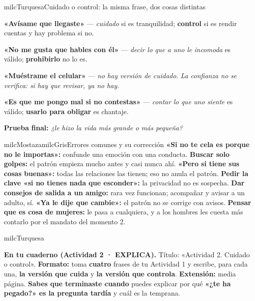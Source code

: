 \documentclass[11pt,letterpaper]{article}
\begin{document}
\begin{drawbox}{milcTurquesa}{Cuidado o control: la misma frase, dos cosas distintas}
\begin{pasoslista}
\item \textbf{«Avísame que llegaste»} — \emph{cuidado} si es tranquilidad; \textbf{control} si es rendir cuentas y hay problema si no.
\item \textbf{«No me gusta que hables con él»} — \emph{decir lo que a uno le incomoda} es válido; \textbf{prohibirlo} no lo es.
\item \textbf{«Muéstrame el celular»} — \emph{no hay versión de cuidado.} \emph{La confianza no se verifica: si hay que revisar, ya no hay.}
\item \textbf{«Es que me pongo mal si no contestas»} — \emph{contar lo que uno siente} es válido; \textbf{usarlo para obligar} es chantaje.
\item \textbf{Prueba final:} \emph{¿le hizo la vida más grande o más pequeña?}
\end{pasoslista}
\end{drawbox}

\begin{softbox}{milcMostaza}{milcGris}{Errores comunes y su corrección}
\textbf{«Si no te cela es porque no le importas»:} confunde una emoción con una conducta. \textbf{Buscar solo golpes:} el patrón empieza mucho antes y casi nunca ahí. \textbf{«Pero si tiene sus cosas buenas»:} todas las relaciones las tienen; eso no anula el patrón. \textbf{Pedir la clave «si no tienes nada que esconder»:} la privacidad no es sospecha. \textbf{Dar consejos de salida a un amigo:} rara vez funcionan; acompañar y avisar a un adulto, sí. \textbf{«Ya le dije que cambie»:} el patrón no se corrige con avisos. \textbf{Pensar que es cosa de mujeres:} le pasa a cualquiera, y a los hombres les cuesta más contarlo por el mandato del momento 2.
\end{softbox}

\begin{infoband}{milcTurquesa}


\textbf{En tu cuaderno (Actividad 2 · EXPLICA).} Título: «Actividad 2. Cuidado o control». \textbf{Formato:} toma \textbf{cuatro} frases de tu Actividad 1 y escribe, para cada una, \textbf{la versión que cuida} y \textbf{la versión que controla}. \textbf{Extensión:} media página. \textbf{Sabes que terminaste cuando} puedes explicar por qué \textbf{«¿te ha pegado?» es la pregunta tardía} y cuál es la temprana.
\end{infoband}
\end{document}
